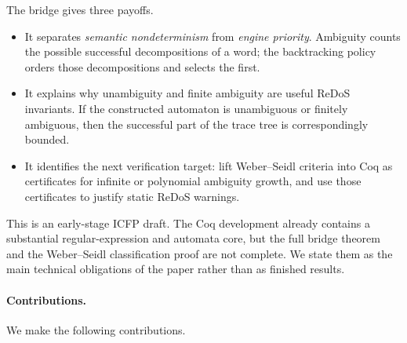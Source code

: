 The bridge gives three payoffs.

\begin{itemize}
\item It separates \emph{semantic nondeterminism} from \emph{engine priority}.
Ambiguity counts the possible successful decompositions of a word; the
backtracking policy orders those decompositions and selects the first.
\item It explains why unambiguity and finite ambiguity are useful ReDoS
invariants.  If the constructed automaton is unambiguous or finitely ambiguous,
then the successful part of the trace tree is correspondingly bounded.
\item It identifies the next verification target: lift Weber--Seidl criteria
into Coq as certificates for infinite or polynomial ambiguity growth, and use
those certificates to justify static ReDoS warnings.
\end{itemize}

This is an early-stage ICFP draft.  The Coq development already contains a
substantial regular-expression and automata core, but the full bridge theorem
and the Weber--Seidl classification proof are not complete.  We state them as
the main technical obligations of the paper rather than as finished results.

\paragraph{Contributions.}
We make the following contributions.

